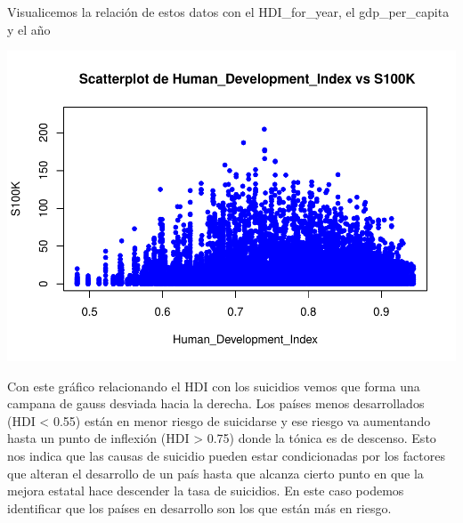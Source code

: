 \documentclass[]{article}
\newenvironment{Shaded}{\begin{snugshade}}{\end{snugshade}}
\newcommand{\CommentTok}[1]{\textcolor[rgb]{0.56,0.35,0.01}{\textit{#1}}}
\newcommand{\DataTypeTok}[1]{\textcolor[rgb]{0.13,0.29,0.53}{#1}}
\newcommand{\DecValTok}[1]{\textcolor[rgb]{0.00,0.00,0.81}{#1}}
\newcommand{\KeywordTok}[1]{\textcolor[rgb]{0.13,0.29,0.53}{\textbf{#1}}}
\newcommand{\NormalTok}[1]{#1}
\newcommand{\OperatorTok}[1]{\textcolor[rgb]{0.81,0.36,0.00}{\textbf{#1}}}
\newcommand{\StringTok}[1]{\textcolor[rgb]{0.31,0.60,0.02}{#1}}
\begin{document}
Visualicemos la relación de estos datos con el HDI\_for\_year, el
gdp\_per\_capita y el año

\begin{Shaded}
\end{Shaded}

\includegraphics{Informe_files/figure-latex/unnamed-chunk-20-1.pdf}

Con este gráfico relacionando el HDI con los suicidios vemos que forma
una campana de gauss desviada hacia la derecha. Los países menos
desarrollados (HDI \textless{} 0.55) están en menor riesgo de suicidarse
y ese riesgo va aumentando hasta un punto de inflexión (HDI
\textgreater{} 0.75) donde la tónica es de descenso. Esto nos indica que
las causas de suicidio pueden estar condicionadas por los factores que
alteran el desarrollo de un país hasta que alcanza cierto punto en que
la mejora estatal hace descender la tasa de suicidios. En este caso
podemos identificar que los países en desarrollo son los que están más
en riesgo.
\end{document}
